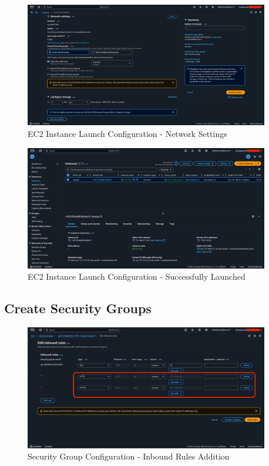 \documentclass[a4paper,12pt]{article}
\begin{document}
\begin{figure}[H]
    \centering
    \includegraphics[width=0.95\textwidth]{launch-instance-2.png}
    \caption{EC2 Instance Launch Configuration - Network Settings}
    \label{fig:ec2-launch2}
\end{figure}

\begin{figure}[H]
    \centering
    \includegraphics[width=0.95\textwidth]{launch-instance-3.png}
    \caption{EC2 Instance Launch Configuration - Successfully Launched}
    \label{fig:ec2-launch3}
\end{figure}

\newpage

\subsection{Create Security Groups}

\begin{figure}[H]
    \centering
    \includegraphics[width=0.95\textwidth]{security-groups-1.png}
    \caption{Security Group Configuration - Inbound Rules Addition}
    \label{fig:security1}
\end{figure}
\end{document}
